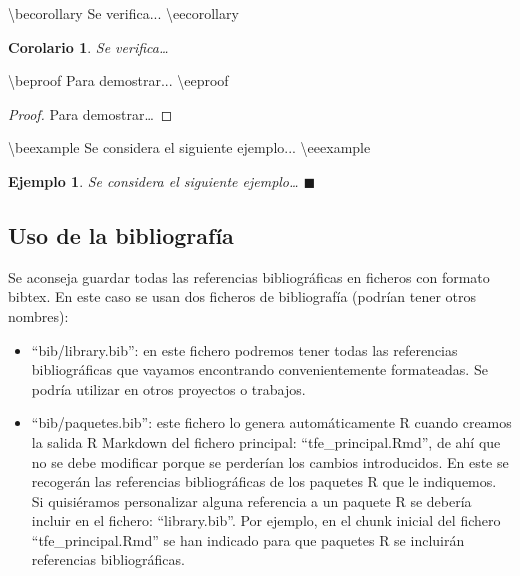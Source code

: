 \documentclass[12pt,a4paper,oneside,]{article}
\newenvironment{Shaded}{\begin{snugshade}}{\end{snugshade}}
\newcommand{\NormalTok}[1]{#1}
\newcommand{\beproof}{\begin{proof}} %
\newcommand{\eeproof}{\end{proof}} %
\newcounter{dummy}
\numberwithin{dummy}{section}
\theoremstyle{ocrenumbox}
\theoremstyle{blacknumex}
\newtheorem{exampleT}{Ejemplo}[section] %
\theoremstyle{blacknumbox}
\newtheorem{corollaryT}[dummy]{Corolario}  %
\theoremstyle{ocrenum}
\newenvironment{example}{\begin{exampleT}}{\hfill{\tiny\ensuremath{\blacksquare}}\end{exampleT}}
\newenvironment{corollary}{\begin{cBox}\begin{corollaryT}}{\end{corollaryT}\end{cBox}}
\theoremstyle{ocrenum}
\newcommand{\beexample}{\begin{example}}
\newcommand{\eeexample}{\end{example}}
\newcommand{\becorollary}{\begin{corollary}}
\newcommand{\eecorollary}{\end{corollary}}
\begin{document}
\begin{Shaded}
\begin{Highlighting}[]
\NormalTok{\textbackslash{}becorollary}
\NormalTok{Se verifica...}
\NormalTok{\textbackslash{}eecorollary}
\end{Highlighting}
\end{Shaded}

\becorollary

Se verifica\ldots{} \eecorollary

\begin{Shaded}
\begin{Highlighting}[]
\NormalTok{\textbackslash{}beproof}
\NormalTok{Para demostrar...}
\NormalTok{\textbackslash{}eeproof}
\end{Highlighting}
\end{Shaded}

\beproof

Para demostrar\ldots{} \eeproof

\begin{Shaded}
\begin{Highlighting}[]
\NormalTok{\textbackslash{}beexample}
\NormalTok{Se considera el siguiente ejemplo...}
\NormalTok{\textbackslash{}eeexample}
\end{Highlighting}
\end{Shaded}

\beexample

Se considera el siguiente ejemplo\ldots{} \eeexample

\hypertarget{uso-de-la-bibliografuxeda}{%
\subsection{Uso de la bibliografía}\label{uso-de-la-bibliografuxeda}}

Se aconseja guardar todas las referencias bibliográficas en ficheros con
formato bibtex. En este caso se usan dos ficheros de bibliografía
(podrían tener otros nombres):

\begin{itemize}
\item
  ``bib/library.bib'': en este fichero podremos tener todas las
  referencias bibliográficas que vayamos encontrando convenientemente
  formateadas. Se podría utilizar en otros proyectos o trabajos.
\item
  ``bib/paquetes.bib'': este fichero lo genera automáticamente R cuando
  creamos la salida R Markdown del fichero principal:
  ``tfe\_principal.Rmd'', de ahí que no se debe modificar porque se
  perderían los cambios introducidos. En este se recogerán las
  referencias bibliográficas de los paquetes R que le indiquemos. Si
  quisiéramos personalizar alguna referencia a un paquete R se debería
  incluir en el fichero: ``library.bib''. Por ejemplo, en el chunk
  inicial del fichero ``tfe\_principal.Rmd'' se han indicado para que
  paquetes R se incluirán referencias bibliográficas.
\end{itemize}
\end{document}
